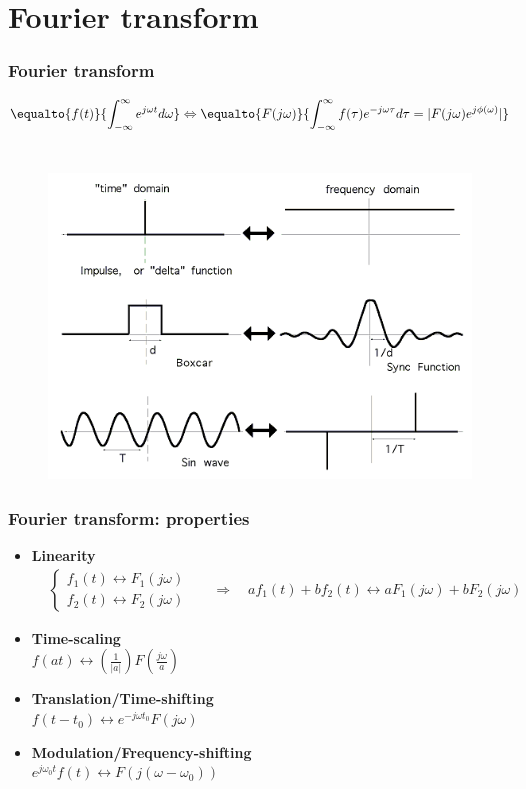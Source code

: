 \section{Fourier transform}

\begin{frame}
	\frametitle{Fourier transform}
	\vspace{-2ex}
	\large{\[
	\equalto{f(t)}{\int_{-\infty}^{\infty} e^{j\omega t} d\omega} \Leftrightarrow \equalto{F(j\omega)}{\int_{-\infty}^{\infty} f(\tau) e^{-j \omega \tau} d \tau = |F(j \omega) e^{j \phi(\omega)}|}
	\]}\\
	\begin{figure}
		\includegraphics[width=0.6\linewidth]{fourier_examples}
	\end{figure}
\end{frame}

\begin{frame}
	\frametitle{Fourier transform: properties}
	\begin{itemize}
		\item \textbf{Linearity} \\
		\vspace{-3ex}
		\begin{align*}
		& \begin{cases}
		f_1(t) \leftrightarrow F_1(j\omega)\\
		f_2(t) \leftrightarrow F_2(j\omega)
		\end{cases} && \Rightarrow \quad a f_1(t) + b f_2(t) \leftrightarrow a F_1(j\omega) + b F_2(j \omega)
		\end{align*}
		\item \textbf{Time-scaling} \\
		\medskip
		$f(a t) \leftrightarrow (\frac{1}{|a|}) F(\frac{j \omega}{a})$
		\medskip
		\item \textbf{Translation/Time-shifting} \\
		\medskip
		$f (t - t_0) \leftrightarrow e^{-j \omega t_0} F(j\omega)$
		\medskip
		\item \textbf{Modulation/Frequency-shifting} \\
		\medskip
		$e^{j \omega_0 t} f(t) \leftrightarrow F(j (\omega - \omega_0))$
	\end{itemize}
\end{frame}

